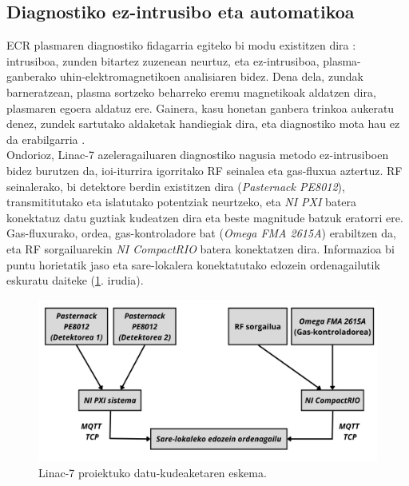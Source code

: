 \documentclass[12pt]{article}
\numberwithin{figure}{section}
\numberwithin{equation}{section}
\begin{document}
\subsection{Diagnostiko ez-intrusibo eta automatikoa}
\label{sec:ez-intrusibo}
ECR plasmaren diagnostiko fidagarria egiteko bi modu existitzen dira \cite{tarvainen_plasma_2019}: intrusiboa, zunden bitartez zuzenean neurtuz, eta ez-intrusiboa, plasma-ganberako uhin-elektromagnetikoen analisiaren bidez. Dena dela, zundak barneratzean, plasma sortzeko beharreko eremu magnetikoak aldatzen dira, plasmaren egoera aldatuz ere. Gainera, kasu honetan ganbera trinkoa aukeratu denez, zundek sartutako aldaketak handiegiak dira, eta diagnostiko mota hau ez da erabilgarria \cite{vivas_merino_sistema_2023}.\\

Ondorioz, Linac-7 azeleragailuaren diagnostiko nagusia metodo ez-intrusiboen bidez burutzen da, ioi-iturrira igorritako RF seinalea eta gas-fluxua aztertuz. RF seinalerako, bi detektore berdin existitzen dira (\textit{Pasternack PE8012}\cite{noauthor_schottky_2025}), transmititutako eta islatutako potentziak neurtzeko, eta \textit{NI PXI} \cite{noauthor_sistemas_2025} batera konektatuz datu guztiak kudeatzen dira eta beste magnitude batzuk eratorri ere. Gas-fluxurako, ordea, gas-kontroladore bat (\textit{Omega FMA 2615A}\cite{noauthor_mass_2025}) erabiltzen da, eta RF sorgailuarekin \textit{NI CompactRIO} \cite{noauthor_sistemas_2025-1} batera konektatzen dira. Informazioa bi puntu horietatik jaso eta sare-lokalera konektatutako edozein ordenagailutik eskuratu daiteke (\ref{fig:datu_eskema}. irudia).

\begin{figure}[h]
    \centering
    \includegraphics[width=\linewidth]{1 - Sarrera/DATU_ESKEMA.png}
    \caption{Linac-7 proiektuko datu-kudeaketaren eskema.}
    \label{fig:datu_eskema}
\end{figure}
\end{document}
